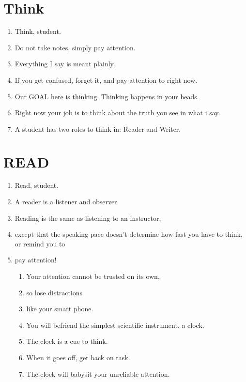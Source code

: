 \documentclass[
]{book}
\providecommand{\tightlist}{%
  \setlength{\itemsep}{0pt}\setlength{\parskip}{0pt}}
\begin{document}
\hypertarget{think}{%
\section{Think}\label{think}}

\begin{enumerate}
\def\labelenumi{\arabic{enumi}.}
\setcounter{enumi}{42}
\tightlist
\item
  Think, student.
\item
  Do not take notes, simply pay attention.
\item
  Everything I say is meant plainly.
\item
  If you get confused, forget it, and pay attention to right now.
\item
  Our GOAL here is thinking. Thinking happens in your heads.
\item
  Right now your job is to think about the truth you see in what i
  say.
\item
  A student has two roles to think in: Reader and Writer.
\end{enumerate}

\hypertarget{read}{%
\section{READ}\label{read}}

\begin{enumerate}
\def\labelenumi{\arabic{enumi}.}
\setcounter{enumi}{49}
\tightlist
\item
  Read, student.
\item
  A reader is a listener and observer.
\item
  Reading is the same as listening to an instructor,
\item
  except that the speaking pace doesn't determine how fast you have to
  think, or remind you to
\item
  pay attention!

  \begin{enumerate}
  \def\labelenumii{\arabic{enumii}.}
  \tightlist
  \item
    Your attention cannot be trusted on its own,
  \item
    so lose distractions
  \item
    like your smart phone.
  \item
    You will befriend the simplest scientific instrument, a clock.
  \item
    The clock is a cue to think.
  \item
    When it goes off, get back on task.
  \item
    The clock will babysit your unreliable attention.
  \end{enumerate}
\end{enumerate}
\end{document}

